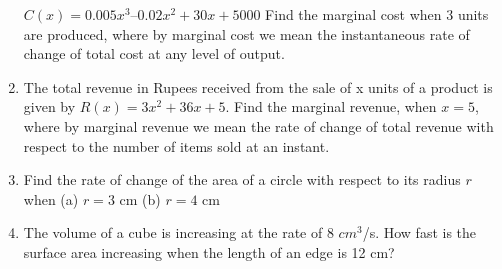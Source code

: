 \begin{enumerate}[label=\arabic*.,ref=\thesubsection.\theenumi]
$C(x) = 0.005 x^3 – 0.02 x^2 + 30x + 5000$
Find the marginal cost when 3 units are produced, where by marginal cost we mean the instantaneous rate of change of total cost at any level of output.
\item The total revenue in Rupees received from the sale of x units of a product is given by $R(x) = 3x^2
+ 36x + 5$. Find the marginal revenue, when $x = 5$, where by marginal revenue we mean the rate of change of total revenue with respect to the number of items sold at an instant.
\item Find the rate of change of the area of a circle with respect to its radius $r$ when (a) $r = 3$ cm
(b) $r = 4$ cm
\item  The volume of a cube is increasing at the rate of 8 $cm^3$/s. How fast is the surface area increasing when the length of an edge is 12 cm?


\end{enumerate}
